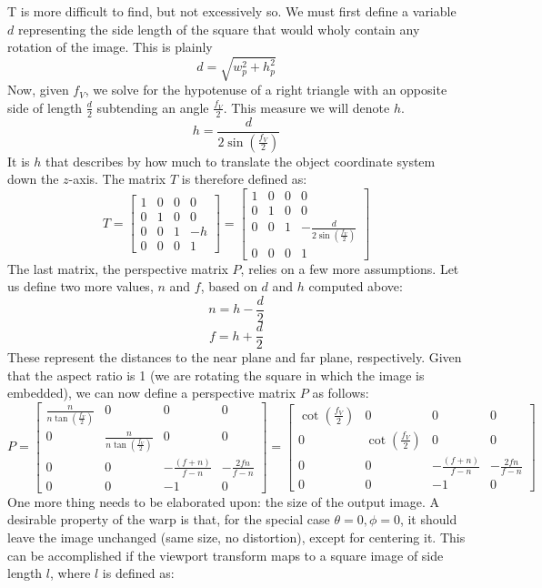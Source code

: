 \documentclass[onecolumn]{article} %
\newcommand{\lp}{\left(}%
\newcommand{\rp}{\right)}%
\begin{document}
\pagebreak

T is more difficult to find, but not excessively so. We must first define a variable $d$ representing the side length of the square that would wholy contain any rotation of the image. This is plainly
\[ d=\sqrt{w_{p}^{2}+h_{p}^{2}} \]
Now, given $f_{V}$, we solve for the hypotenuse of a right triangle with an opposite side of length $\frac{d}{2}$ subtending an angle $\frac{f_{V}}{2}$. This measure we will denote $h$.
\[ h = \frac{d}{2\sin\lp\frac{f_{V}}{2}\rp} \]
It is $h$ that describes by how much to translate the object coordinate system down the $z$-axis. The matrix $T$ is therefore defined as: 
\[ T = \left[\begin{array}{cccc}1 & 0 & 0 & 0 \\0 & 1 & 0 & 0 \\0 & 0 & 1 & -h \\0 & 0 & 0 & 1\end{array}\right] = \left[\begin{array}{cccc}1 & 0 & 0 & 0 \\0 & 1 & 0 & 0 \\0 & 0 & 1 & -\frac{d}{2\sin\lp\frac{f_{V}}{2}\rp} \\0 & 0 & 0 & 1\end{array}\right] \]
The last matrix, the perspective matrix $P$, relies on a few more assumptions. Let us define two more values, $n$ and $f$, based on $d$ and $h$ computed above:
\[ n = h-\frac{d}{2} \]
\[ f = h+\frac{d}{2} \]
These represent the distances to the near plane and far plane, respectively. Given that the aspect ratio is 1 (we are rotating the square in which the image is embedded), we can now define a perspective matrix $P$ as follows:
\[ P = \left[\begin{array}{cccc}\frac{n}{n\tan\lp\frac{f_{V}}{2}\rp} & 0 & 0 & 0 \\0 & \frac{n}{n\tan\lp\frac{f_{V}}{2}\rp} & 0 & 0 \\0 & 0 & -\frac{(f+n)}{f-n} & -\frac{2fn}{f-n} \\0 & 0 & -1 & 0\end{array}\right] = \left[\begin{array}{cccc}\cot\lp\frac{f_{V}}{2}\rp & 0 & 0 & 0 \\0 & \cot\lp\frac{f_{V}}{2}\rp & 0 & 0 \\0 & 0 & -\frac{(f+n)}{f-n} & -\frac{2fn}{f-n} \\0 & 0 & -1 & 0\end{array}\right] \]
One more thing needs to be elaborated upon: the size of the output image. A desirable property of the warp is that, for the special case $\theta=0, \phi=0$, it should leave the image unchanged (same size, no distortion), except for centering it. This can be accomplished if the viewport transform maps to a square image of side length $l$, where $l$ is defined as:
\end{document}
